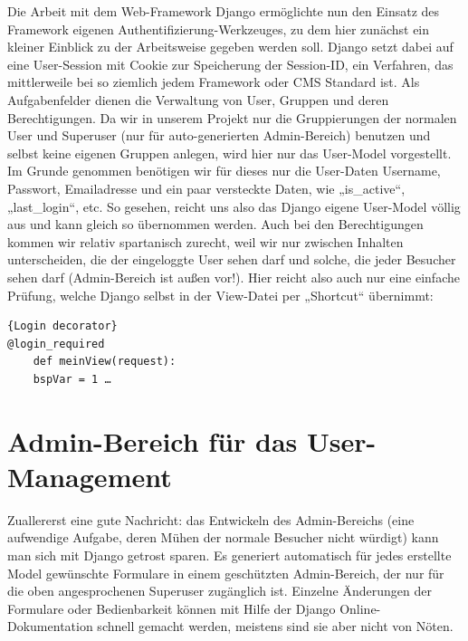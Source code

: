 Die Arbeit mit dem Web-Framework Django ermöglichte nun den Einsatz des 
Framework eigenen Authentifizierung-Werkzeuges, zu dem hier zunächst ein
kleiner Einblick zu der Arbeitsweise gegeben werden soll. Django setzt dabei
auf eine User-Session mit Cookie zur Speicherung der Session-ID, ein Verfahren,
das mittlerweile bei so ziemlich jedem Framework oder CMS Standard ist. Als 
Aufgabenfelder dienen die Verwaltung von User, Gruppen und deren
Berechtigungen. Da wir in unserem Projekt nur die Gruppierungen der normalen 
User und Superuser (nur für auto-generierten Admin-Bereich) benutzen und selbst
keine eigenen Gruppen anlegen, wird hier nur das User-Model vorgestellt. Im
Grunde genommen benötigen wir für dieses nur die User-Daten Username, Passwort,
Emailadresse und ein paar versteckte Daten, wie „is\_active“, „last\_login“,
etc. So gesehen, reicht uns also das Django eigene User-Model völlig aus und 
kann gleich so übernommen werden. Auch bei den Berechtigungen kommen wir relativ 
spartanisch zurecht, weil wir nur zwischen Inhalten unterscheiden, die der 
eingeloggte User sehen darf und solche, die jeder Besucher sehen darf 
(Admin-Bereich ist außen vor!). Hier reicht also auch nur eine einfache
Prüfung,  welche Django selbst in der View-Datei per „Shortcut“ übernimmt:

\begin{lstlisting}[caption=Decorator]{Login decorator}
@login_required
    def meinView(request):
    bspVar = 1 …
\end{lstlisting}

\section{Admin-Bereich für das User-Management}
Zuallererst eine gute Nachricht: das Entwickeln des Admin-Bereichs  (eine
aufwendige Aufgabe, deren Mühen der normale Besucher nicht würdigt) kann man 
sich mit Django getrost sparen. Es generiert automatisch für jedes erstellte 
Model gewünschte Formulare in einem geschützten Admin-Bereich, der nur für die 
oben angesprochenen Superuser zugänglich ist. Einzelne Änderungen der Formulare
oder Bedienbarkeit können mit Hilfe der Django Online-Dokumentation schnell 
gemacht werden, meistens sind sie aber nicht von Nöten.


